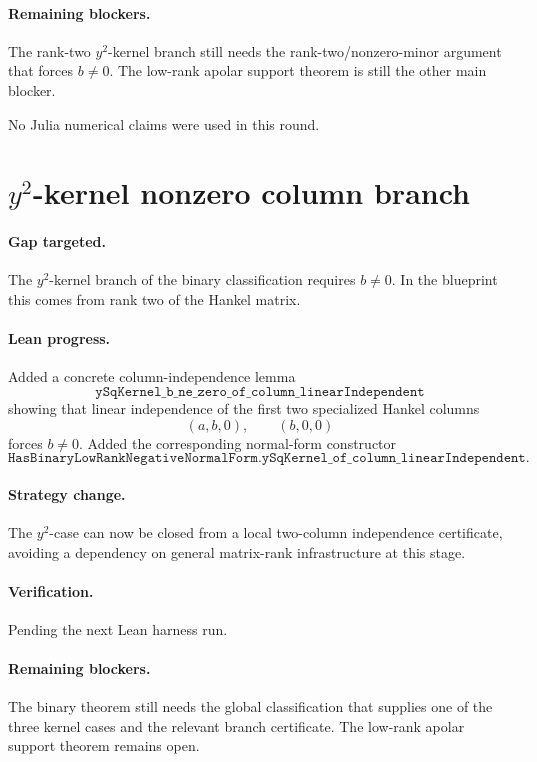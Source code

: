 \documentclass[11pt]{article}
\begin{document}
\paragraph{Remaining blockers.}
The rank-two \(y^2\)-kernel branch still needs the rank-two/nonzero-minor
argument that forces \(b\ne0\).  The low-rank apolar support theorem is still
the other main blocker.

No Julia numerical claims were used in this round.

\section*{\(y^2\)-kernel nonzero column branch}

\paragraph{Gap targeted.}
The \(y^2\)-kernel branch of the binary classification requires \(b\ne0\).
In the blueprint this comes from rank two of the Hankel matrix.

\paragraph{Lean progress.}
Added a concrete column-independence lemma
\[
\texttt{ySqKernel\_b\_ne\_zero\_of\_column\_linearIndependent}
\]
showing that linear independence of the first two specialized Hankel columns
\[
(a,b,0),\qquad (b,0,0)
\]
forces \(b\ne0\).  Added the corresponding normal-form constructor
\[
\texttt{HasBinaryLowRankNegativeNormalForm.ySqKernel\_of\_column\_linearIndependent}.
\]

\paragraph{Strategy change.}
The \(y^2\)-case can now be closed from a local two-column independence
certificate, avoiding a dependency on general matrix-rank infrastructure at
this stage.

\paragraph{Verification.}
Pending the next Lean harness run.

\paragraph{Remaining blockers.}
The binary theorem still needs the global classification that supplies one of
the three kernel cases and the relevant branch certificate.  The low-rank
apolar support theorem remains open.
\end{document}
